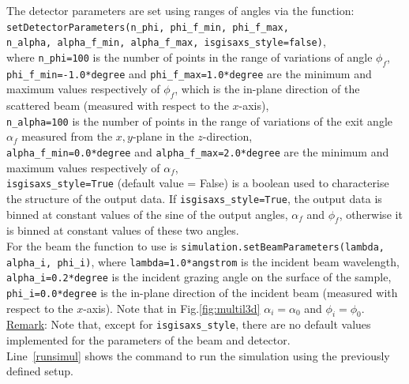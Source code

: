 \noindent The detector parameters are set using ranges of angles via
the function:\\

\noindent \texttt{setDetectorParameters(n\_phi, phi\_f\_min,
  phi\_f\_max,\\ \phantom{setDetectorParameters(}n\_alpha, alpha\_f\_min, alpha\_f\_max, isgisaxs\_style=false)}, \\

\noindent where \texttt{n\_phi=100} is the number of points in the range of
variations of angle $\phi_f$,\\ \texttt{phi\_f\_min=-1.0*degree} and \texttt{phi\_f\_max=1.0*degree}
are the minimum and maximum values respectively of $\phi_f$, which is the in-plane direction of the scattered beam
(measured with respect to the $x$-axis), \\ \texttt{n\_alpha=100} is
the number of points in the range of variations of the exit angle
$\alpha_f$ measured from the $x,y$-plane in the $z$-direction,\\ \texttt{alpha\_f\_min=0.0*degree} and \texttt{alpha\_f\_max=2.0*degree} 
are the minimum and maximum values respectively of $\alpha_f$,\\
\texttt{isgisaxs\_style=True} (default value = False) is a boolean
used to characterise the structure of the output data. If
\texttt{isgisaxs\_style=True}, the output data is binned at constant
values of the sine of the output angles, $\alpha_f$ and $\phi_f$, otherwise it is binned
at constant values of these two angles.\\


\noindent For the beam the function to use is
\texttt{simulation.setBeamParameters(lambda, alpha\_i, phi\_i)}, where
\texttt{lambda=1.0*angstrom} is the incident beam wavelength,\\
\texttt{alpha\_i=0.2*degree} is the incident
grazing angle on the surface of the sample,
\texttt{phi\_i=0.0*degree} is the in-plane
direction of the incident beam (measured with respect to the
$x$-axis). Note that in Fig.\ref{fig:multil3d} $\alpha_i=\alpha_0$ and $\phi_i=\phi_0$.\\ 

\noindent \underline{Remark}: Note that, except for
\texttt{isgisaxs\_style}, there are no default values implemented for the
parameters of the beam and detector.\\

\noindent Line~\ref{runsimul} shows the command to run the simulation using the
previously defined setup.


